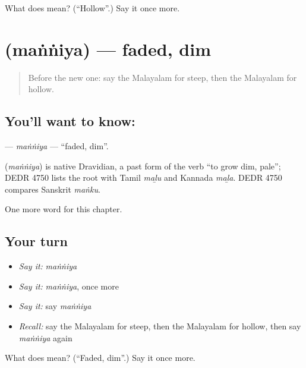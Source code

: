 \begin{tcolorbox}[breakable,colback=teal!4,colframe=teal!35!black,title={Before you move on}]
What does  mean? (\textquotedblleft{}Hollow\textquotedblright{}.) Say it once more.
\end{tcolorbox}
\section[\texorpdfstring{\ml{മങ്ങിയ} (maṅṅiya)}{മങ്ങിയ (maṅṅiya)}]{ (maṅṅiya) — faded, dim}

\label{lesson:ML-C285-manniya}



\begin{quote}
Before the new one: say the Malayalam for steep, then the Malayalam for hollow.
\end{quote}

\subsection*{You'll want to know: }
\textbf{} — \emph{maṅṅiya} — \textquotedblleft{}faded, dim\textquotedblright{}.

\begin{cousinweb}
\textbf{} (\emph{maṅṅiya}) is native Dravidian, a past form of the verb \textquotedblleft{}to grow dim, pale\textquotedblright{}; DEDR 4750 lists the root with Tamil \emph{maḻu} and Kannada \emph{maḻa}. DEDR 4750 compares Sanskrit \emph{maṅku}.
\end{cousinweb}

\begin{grammarlens}[title={What you've built}]
One more word for this chapter.
\end{grammarlens}

\subsection*{Your turn}
\begin{itemize}
\raggedright
  \item \emph{Say it:} \emph{maṅṅiya}
  \item \emph{Say it:} \emph{maṅṅiya}, once more
  \item \emph{Say it:} say \emph{maṅṅiya}
  \item \emph{Recall:} say the Malayalam for steep, then the Malayalam for hollow, then say \emph{maṅṅiya} again
\end{itemize}

\begin{tcolorbox}[breakable,colback=teal!4,colframe=teal!35!black,title={Before you move on}]
What does  mean? (\textquotedblleft{}Faded, dim\textquotedblright{}.) Say it once more.
\end{tcolorbox}
